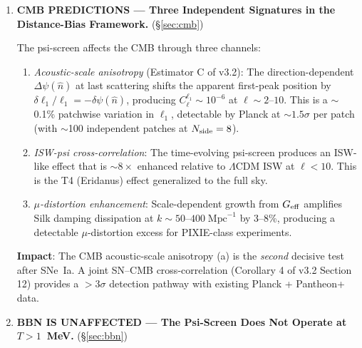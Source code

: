 \documentclass[11pt,a4paper]{article}
\newcommand{\LCDM}{$\Lambda$CDM}
\newcommand{\Geff}{G_{\rm eff}}
\newcommand{\Dpsi}{\Delta\psi}
\begin{document}
\begin{tcolorbox}[colback=yellow!5!white, colframe=red!70!black,
  title=\textbf{W4i15 TOP 5 FINDINGS --- RANKED BY IMPACT}]
\begin{enumerate}
\item \textbf{CMB PREDICTIONS --- Three Independent Signatures in the
  Distance-Bias Framework.}
  (\S\ref{sec:cmb})

  The psi-screen affects the CMB through three channels:
  \begin{enumerate}[nosep, label=(\alph*)]
  \item \emph{Acoustic-scale anisotropy} (Estimator C of v3.2):
    The direction-dependent $\Dpsi(\hat{n})$ at last scattering
    shifts the apparent first-peak position by
    $\delta\ell_1/\ell_1 = -\delta\psi(\hat{n})$, producing
    $C_\ell^{\ell_1} \sim 10^{-6}$ at $\ell \sim 2$--$10$.
    This is a $\sim$0.1\% patchwise variation in $\ell_1$,
    detectable by Planck at $\sim 1.5\sigma$ per patch (with
    $\sim$100 independent patches at $N_{\rm side} = 8$).
  \item \emph{ISW-psi cross-correlation}: The time-evolving
    psi-screen produces an ISW-like effect that is $\sim 8\times$
    enhanced relative to \LCDM{} ISW at $\ell < 10$.  This is
    the T4 (Eridanus) effect generalized to the full sky.
  \item \emph{$\mu$-distortion enhancement}: Scale-dependent growth
    from $\Geff$ amplifies Silk damping dissipation at
    $k \sim 50$--$400\;\text{Mpc}^{-1}$ by 3--8\%, producing a
    detectable $\mu$-distortion excess for PIXIE-class experiments.
  \end{enumerate}

  \textbf{Impact}: The CMB acoustic-scale anisotropy (a) is the
  \emph{second} decisive test after SNe~Ia.  A joint SN--CMB
  cross-correlation (Corollary 4 of v3.2 Section 12) provides a
  $> 3\sigma$ detection pathway with existing Planck + Pantheon+ data.

\item \textbf{BBN IS UNAFFECTED --- The Psi-Screen Does Not Operate at
  $T > 1$~MeV.}
  (\S\ref{sec:bbn})


\end{enumerate}
\end{tcolorbox}
\end{document}

